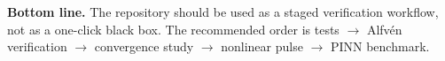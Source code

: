 \documentclass[11pt]{article}
\begin{document}
\begin{overviewbox}
\textbf{Bottom line.} The repository should be used as a staged verification workflow, not as a one-click black box. The recommended order is tests $\rightarrow$ Alfv\'en verification $\rightarrow$ convergence study $\rightarrow$ nonlinear pulse $\rightarrow$ PINN benchmark.
\end{overviewbox}
\end{document}
